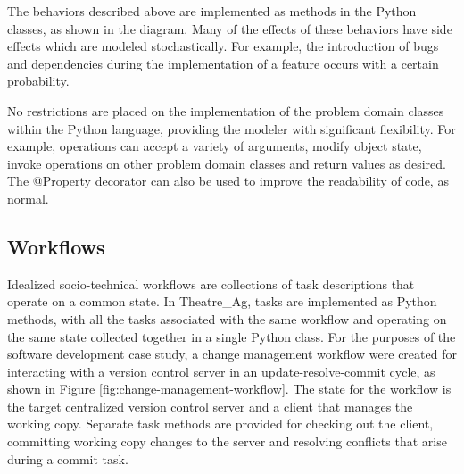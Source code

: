 \documentclass{llncs}
\begin{document}
The behaviors described above are implemented as methods in the Python classes, as shown in the diagram.  Many of the
effects of these behaviors have side effects which are modeled stochastically. For example, the introduction of bugs and
dependencies during the implementation of a feature occurs with a certain probability.

No restrictions are placed on the implementation of the problem domain classes within the Python language, providing the
modeler with significant flexibility.  For example, operations can accept a variety of arguments, modify object state,
invoke operations on other problem domain classes and return values as desired. The @Property decorator can also be used
to improve the readability of code, as normal.


\subsection{Workflows}


Idealized socio-technical workflows are collections of task descriptions that operate on a common state.  In Theatre\_Ag,
tasks are implemented as Python methods, with all the tasks associated with the same workflow and operating on the same
state collected together in a single Python class.  For the purposes of the software development case study, a change
management workflow were created for interacting with a version control server in an update-resolve-commit cycle, as
shown in Figure \ref{fig:change-management-workflow}.  The state for the workflow is the target centralized version
control server and a client that manages the working copy.  Separate task methods are provided for checking out the
client, committing working copy changes to the server and resolving conflicts that arise during a commit task.
\end{document}
